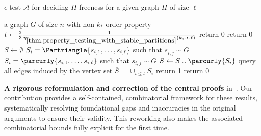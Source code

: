     \begin{algorithm}[H]
        \caption{$\epsilon$-test $\mathcal{A}$ for deciding $H$-freeness for a given graph $H$ of size $\ell$}
        \label{alg:h-freeness_tester}
        \begin{algorithmic}[1]
            \Require a graph $G$ of size $n$ with non-$k_*$-order property
            \State $t \leftarrow \frac{2}{3}\frac{1}{\eta_{\ref{thm:property_testing_with_stable_partitions}}(k_*, \epsilon, \ell)}$
                \State return 0 \label{line:G_smaller_then_H}
                \State return 0 \label{line:G_and_H_too_small_for_t}
            \Else
                \State $S \leftarrow \emptyset$
                    \State $S_i = \Partriangle{s_{i,1}, \dots, s_{i,\ell}}$ such that $s_{i,j} \sim G$
                        \State $S_i = \parcurly{s_{i,1}, \dots, s_{i,\ell}}$ such that $s_{i,j} \sim G$
                    \EndWhile
                    \State $S \leftarrow S \cup \parcurly{S_i}$
                \EndWhile
                \State query all edges induced by the vertex set $\overline{S} = \cup_{i \leq t} S_i$
                    \State return 1 \label{line:found_H}
                \Else
                    \State return 0 \label{line:not_found_H}
                \EndIf
            \EndIf
        \end{algorithmic}
    \end{algorithm}


    \item \textbf{A rigorous reformulation and correction of the central proofs}
        in~\cite{regularity_lemmas_for_stable_graphs}.
        Our contribution provides a self-contained, combinatorial framework for these results, systematically
        resolving foundational gaps and inaccuracies in the original arguments to ensure their validity.
        This reworking also makes the associated combinatorial bounds fully explicit for the first time.


